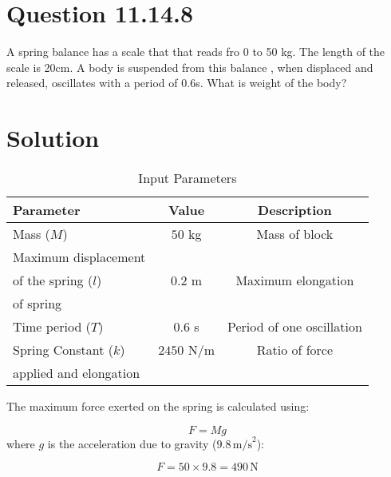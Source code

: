 \documentclass[journal,12pt,twocolumn]{IEEEtran}
\theoremstyle{remark}
\begin{document}
\section{Question 11.14.8}A spring balance has a scale that that reads fro 0 to 50 kg. The length of the scale is 20cm. A body is suspended from this balance , when displaced and released, oscillates with a period of 0.6s. What is weight of the body? 

\section{Solution}
\begin{table}[htbp]
    \centering
    \caption{Input Parameters}
    \label{tab:parameters}
    \begin{tabular}{lcc}
        \toprule
        \textbf{Parameter} & \textbf{Value} & \textbf{Description} \\
        \midrule
        Mass ($M$) & $50$ kg & Mass of block \\
        Maximum displacement \\ of the spring ($l$) & $0.2$ m & Maximum elongation \\ of spring \\
        Time period ($T$) & $0.6$ s & Period of one oscillation \\
        Spring Constant ($k$) & $2450$ N/m & Ratio of force \\ applied and elongation \\
        \bottomrule
    \end{tabular}
\end{table}

The maximum force exerted on the spring is calculated using:

	\begin{equation}
F = Mg
	\end{equation}
where \( g \) is the acceleration due to gravity (\( 9.8 \, \text{m/s}^2 \)):\

	\begin{equation}
F = 50 \times 9.8 = 490 \, \text{N}
	\end{equation}
\end{document}
